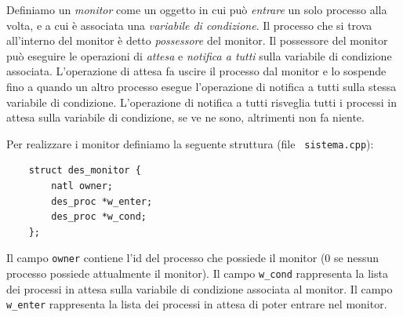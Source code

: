 Definiamo un {\em monitor} come un oggetto in cui pu\`o {\em entrare}
un solo processo alla volta, e a cui \`e associata una {\em
variabile di condizione}. 
Il processo che si trova all'interno del monitor \`e detto {\em possessore}
del monitor.
Il possessore del monitor pu\`o eseguire le
operazioni di {\em attesa} e {\em notifica a tutti} sulla variabile di condizione
associata. L'operazione di attesa fa uscire il processo dal monitor e lo 
sospende fino a quando un
altro processo esegue l'operazione di notifica a tutti sulla stessa variabile di
condizione. L'operazione di notifica a tutti risveglia tutti i processi in attesa
sulla variabile di condizione, se ve ne sono, altrimenti non fa niente.

Per realizzare i monitor definiamo la seguente struttura (file {\tt
sistema.cpp}):

\begin{verbatim}
    struct des_monitor {
        natl owner;
        des_proc *w_enter;
        des_proc *w_cond;
    };
\end{verbatim}

Il campo {\tt owner} contiene l'id del processo che possiede il monitor (0 se
nessun processo possiede attualmente il monitor).  
Il campo \verb|w_cond| rappresenta la lista dei processi in attesa
sulla variabile di condizione associata al monitor.
Il campo \verb|w_enter| rappresenta la lista dei processi in attesa
di poter entrare nel monitor. 

